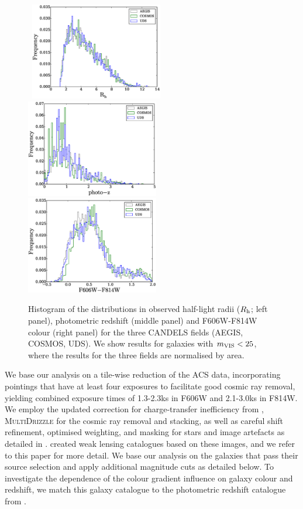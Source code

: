 \documentclass[useAMS,usenatbib]{mnras}
\begin{document}
\begin{figure}
  \hbox{
    \includegraphics[width=5.8cm]{zhisrh.eps}
    \includegraphics[width=5.8cm]{zhisphotoz.eps}
    \includegraphics[width=5.8cm]{zhiscolor.eps}}
  \caption{Histogram of the distributions in observed half-light radii ($R_{\rm h}$; left panel),
  photometric redshift (middle panel) and F606W-F814W colour (right panel) for the three
  CANDELS fields (AEGIS, COSMOS, UDS). We show results for galaxies with $m_{\rm VIS}<25$,
  where the results for the three fields are normalised by area.}
  \label{fig:datapro1}
\end{figure}
%

We base our analysis on a tile-wise reduction of the ACS data, incorporating pointings that have at least four exposures to facilitate good cosmic ray removal, yielding combined exposure times of 1.3-2.3ks in F606W and 2.1-3.0ks in F814W.  We employ the updated correction for charge-transfer inefficiency from \cite{massey2014}, \textsc{MultiDrizzle} \citep{koekemoer2003} for the cosmic ray removal and stacking, as well as careful shift refinement, optimised weighting, and masking for stars and image artefacts as detailed in \cite{Schrabback10}.  \cite{Schrabback16} created weak lensing catalogues based on these images, and we refer to this paper for more detail.  We base our analysis on the galaxies that pass their source selection and apply additional magnitude cuts as detailed below. To investigate the dependence of the colour gradient influence on galaxy colour and redshift, we match this galaxy catalogue to the photometric redshift catalogue from \cite{skelton14}.  
\end{document}
